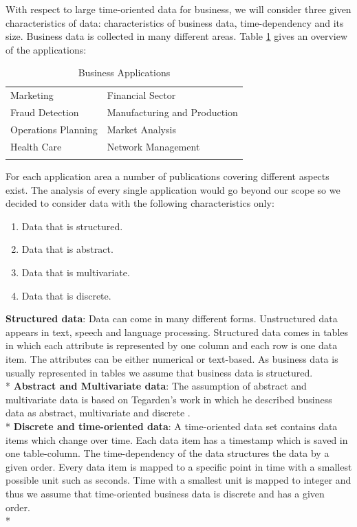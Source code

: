 With respect to large time-oriented data for business, we will consider three given characteristics of data: characteristics of business data, time-dependency and its size. Business data is collected in many different areas. Table \ref{table:applications} gives an overview of the applications: 

\begin{table}[H]
	\centering
	\caption[Business Applications]{Business Applications  \cite{Brachman1996,Tegarden1999}}
	\label{businessapplications}
	\begin{tabular}{ll}
	\toprule
	Marketing & Financial Sector \\
	Fraud Detection & Manufacturing and Production \\
	Operations Planning & Market Analysis \\
	Health Care & Network Management\\
	\bottomrule
	\label{table:applications}
	\end{tabular}
\end{table}
For each application area a number of publications covering different aspects exist. The analysis of every single application would go beyond our scope so we decided to consider data with the following characteristics only: 
\begin{enumerate}
    \item Data that is structured. 
    \item Data that is abstract.
    \item Data that is multivariate.
    \item Data that is discrete.
\end{enumerate}

\textbf{Structured data}: Data can come in many different forms. Unstructured data appears in text, speech and language processing. Structured data comes in tables in which each attribute is represented by one column and each row is one data item. The attributes can be either numerical or text-based. As business data is usually represented in tables  \cite{Borgo2013} we assume that business data is structured.\\*
\textbf{Abstract and Multivariate data}: The assumption of abstract and multivariate data is based on Tegarden's work in which he described business data as abstract, multivariate and discrete \cite{Tegarden1999}. 
\\*
\textbf{Discrete and time-oriented data}: A time-oriented data set contains data items which change over time. Each data item has a timestamp which is saved in one table-column. The time-dependency of the data structures the data by a given order. Every data item is mapped to a specific point in time with a smallest possible unit such as seconds. Time with a smallest unit is mapped to integer  \cite{Aigner2011} and thus we assume that time-oriented business data is discrete and has a given order.  \\*



